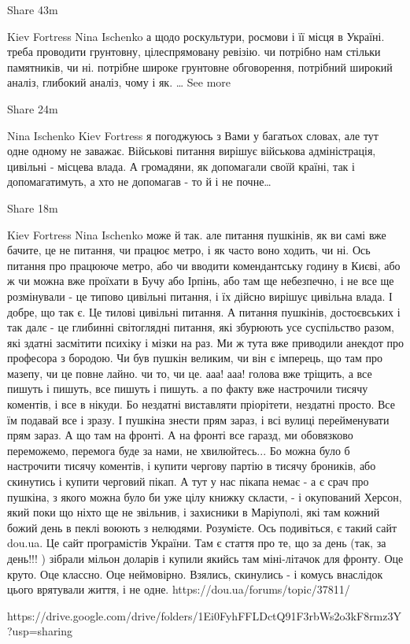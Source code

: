     Share
    43m

Kiev Fortress
Nina Ischenko а щодо роскультури, росмови і її місця в Україні. треба проводити грунтовну, цілеспрямовану ревізію. чи потрібно нам стільки памятників, чи ні. потрібне широке грунтовне обговорення, потрібний широкий аналіз, глибокий аналіз, чому і як. … See more

    Share
    24m

Nina Ischenko
Kiev Fortress я погоджуюсь з Вами у багатьох словах, але тут одне одному не заважає. Військові питання вирішує військова адміністрація, цивільні - місцева влада. А громадяни, як допомагали своїй країні, так і допомагатимуть, а хто не допомагав - то й і не почне…

    Share
    18m

Kiev Fortress Nina Ischenko може й так. але питання пушкінів, як ви самі вже
бачите, це не питання, чи працює метро, і як часто воно ходить, чи ні. Ось
питання про працююче метро, або чи вводити комендантську годину в Києві, або ж
чи можна вже проїхати в Бучу або Ірпінь, або там ще небезпечно, і не все ще
розмінували - це типово цивільні питання, і їх дійсно вирішує цивільна влада. І
добре, що так є. Це тилові цивільні питання. А питання пушкінів, достоєвських і
так далє - це глибинні світоглядні питання, які збурюють усе суспільство разом,
які здатні засмітити психіку і мізки на раз. Ми ж тута вже приводили анекдот
про професора з бородою. Чи був пушкін великим, чи він є імперець, що там про
мазепу, чи це повне лайно. чи то, чи це. ааа! ааа! голова вже тріщить, а все
пишуть і пишуть, все пишуть і пишуть. а по факту вже настрочили тисячу
коментів, і все в нікуди. Бо нездатні виставляти пріорітети, нездатні просто.
Все їм подавай все і зразу. І пушкіна знести прям зараз, і всі вулиці
перейменувати прям зараз. А що там на фронті. А на фронті все гаразд, ми
обовязково переможемо, перемога буде за нами, не хвилюйтесь... Бо можна було б
настрочити тисячу коментів, і купити чергову партію в тисячу броників, або
скинутись і купити черговий пікап. А тут у нас пікапа немає - а є срач про
пушкіна, з якого можна було би уже цілу книжку скласти, - і окупований Херсон,
який поки що ніхто ще не звільнив, і захисники в Маріуполі, які там кожний
божий день в пеклі воюють з нелюдями. Розумієте. Ось подивіться, є такий сайт
dou.ua. Це сайт програмістів України. Там є стаття про те, що за день (так, за
день!!! ) зібрали мільон доларів і купили якийсь там міні-літачок для фронту.
Оце круто. Оце классно. Оце неймовірно. Взялись, скинулись - і комусь внаслідок
цього врятували життя, і не одне. https://dou.ua/forums/topic/37811/


https://drive.google.com/drive/folders/1Ei0FyhFFLDctQ91F3rbWs2o3kF8rmz3Y?usp=sharing
